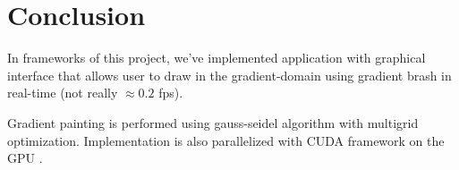 \documentclass[hidelinks, english]{report}
\begin{document}
\section{Conclusion}

In frameworks of this project, we've implemented application with graphical interface that allows user to draw in
the gradient-domain using gradient brash in real-time (not really  $\approx 0.2$ fps).

Gradient painting is performed using gauss-seidel algorithm with multigrid optimization. Implementation is also
parallelized with CUDA framework on the GPU .



\end{document}
